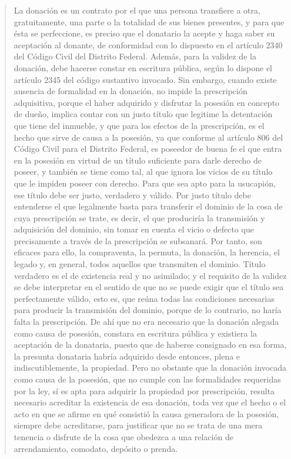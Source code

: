 \documentclass[11pt,a4paper]{article}
\begin{document}
\begin{quote}
La donación es un contrato por el que una persona transfiere a otra, gratuitamente, una parte o la
totalidad de sus bienes presentes, y para que ésta se perfeccione, es preciso que el donatario la
acepte y haga saber su aceptación al donante, de conformidad con lo dispuesto en el artículo 2340
del Código Civil del Distrito Federal. Además, para la validez de la donación, debe hacerse constar
en escritura pública, según lo dispone el artículo 2345 del código sustantivo invocado. Sin embargo,
cuando existe ausencia de formalidad en la donación, no impide la prescripción adquisitiva, porque
el haber adquirido y disfrutar la posesión en concepto de dueño, implica contar con un justo título
que legitime la detentación que tiene del inmueble, y que para los efectos de la prescripción, es el
hecho que sirve de causa a la posesión, ya que conforme al artículo 806 del Código Civil para el
Distrito Federal, es poseedor de buena fe el que entra en la posesión en virtud de un título suficiente
para darle derecho de poseer, y también se tiene como tal, al que ignora los vicios de su título que
le impiden poseer con derecho. Para que sea apto para la usucapión, ese título debe ser justo,
verdadero y válido. Por justo título debe entenderse el que legalmente basta para transferir el
dominio de la cosa de cuya prescripción se trate, es decir, el que produciría la transmisión y
adquisición del dominio, sin tomar en cuenta el vicio o defecto que precisamente a través de la
prescripción se subsanará. Por tanto, son eficaces para ello, la compraventa, la permuta, la
donación, la herencia, el legado y, en general, todos aquellos que transmiten el dominio. Título
verdadero es el de existencia real y no asimilado; y el requisito de la validez se debe interpretar en
el sentido de que no se puede exigir que el título sea perfectamente válido, esto es, que reúna todas
las condiciones necesarias para producir la transmisión del dominio, porque de lo contrario, no haría
falta la prescripción. De ahí que no era necesario que la donación alegada como causa de posesión,
constara en escritura pública y existiera la aceptación de la donataria, puesto que de haberse
consignado en esa forma, la presunta donataria habría adquirido desde entonces, plena e
indiscutiblemente, la propiedad. Pero no obstante que la donación invocada como causa de la
posesión, que no cumple con las formalidades requeridas por la ley, sí es apta para adquirir la
propiedad por prescripción, resulta necesario acreditar la existencia de esa donación, toda vez que
el hecho o el acto en que se afirme en qué consistió la causa generadora de la posesión, siempre
debe acreditarse, para justificar que no se trata de una mera tenencia o disfrute de la cosa que
obedezca a una relación de arrendamiento, comodato, depósito o prenda.


\end{quote}
\end{document}
